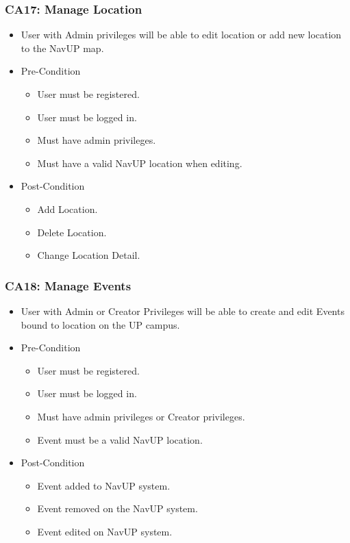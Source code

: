 \documentclass[12pt,a4paper]{article}
\begin{document}
		\subsubsection{CA17: Manage Location}
			\begin{itemize}
				\item User with Admin privileges will be able to edit location or add new location to the NavUP map.
				\item Pre-Condition
					\begin{itemize}
						\item User must be registered.
						\item User must be logged in.
						\item Must have admin privileges.
						\item Must have a valid NavUP location when editing.
					\end{itemize}
				\item Post-Condition
					\begin{itemize}
						\item Add Location.
						\item Delete Location.
						\item Change Location Detail.
					\end{itemize}
			\end{itemize}
		\subsubsection{CA18: Manage Events}
			\begin{itemize}
				\item User with Admin or Creator Privileges will be able to create and edit Events bound to location on the UP campus.
				\item Pre-Condition
					\begin{itemize}
						\item User must be registered.
						\item User must be logged in.
						\item Must have admin privileges or Creator privileges.
						\item Event must be a valid NavUP location.
					\end{itemize}
				\item Post-Condition
					\begin{itemize}
						\item Event added to NavUP system.
						\item Event removed on the NavUP system.
						\item Event edited on NavUP system.
					\end{itemize}
			\end{itemize}
\end{document}
